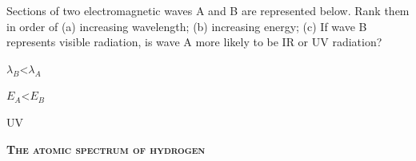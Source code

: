 \documentclass[main.tex]{subfiles}
\begin{document}
\begin{multicols*}{2}
\vspace{-0.5cm}\begin{question}[ID=\the\value{numA}]
Sections of two electromagnetic waves A and B  are represented below. Rank them in order of (a) increasing wavelength; (b) increasing energy;  (c) If wave B represents visible radiation, is wave A more likely to be IR or UV radiation?  
\begin{centering}
     \end{centering}
\end{question}
\begin{solution}
\begin{inparaenum}[(a)]
\item     $\lambda_B$<$\lambda_A$
\item     $E_A$<$E_B$
\item UV
\end{inparaenum}
\hspace{0.1cm}\end{solution}
 {\raggedright\textsc{\textbf{The atomic spectrum of hydrogen }}\par}


\end{multicols*}
\end{document}
